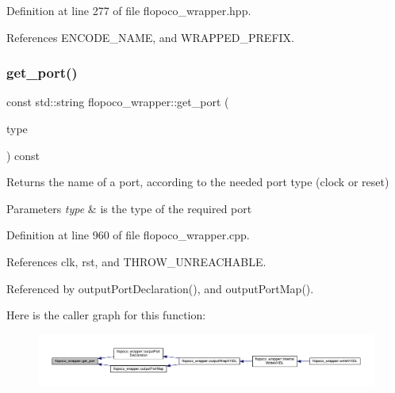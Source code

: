 Definition at line 277 of file flopoco\+\_\+wrapper.\+hpp.



References E\+N\+C\+O\+D\+E\+\_\+\+N\+A\+ME, and W\+R\+A\+P\+P\+E\+D\+\_\+\+P\+R\+E\+F\+IX.

\mbox{\label{classflopoco__wrapper_a582a468cce4977d1a2af23e5f719af2c}} 
\subsubsection{\texorpdfstring{get\+\_\+port()}{get\_port()}}
{\footnotesize\ttfamily const std\+::string flopoco\+\_\+wrapper\+::get\+\_\+port (\begin{DoxyParamCaption}\item[{\hyperlink{classflopoco__wrapper_af27fdf36f1f15e00384aeee46b6de5ac}{port\+\_\+type}}]{type }\end{DoxyParamCaption}) const\hspace{0.3cm}{\ttfamily [private]}}



Returns the name of a port, according to the needed port type (clock or reset) 


\begin{DoxyParams}{Parameters}
{\em type} & is the type of the required port \\
\hline
\end{DoxyParams}


Definition at line 960 of file flopoco\+\_\+wrapper.\+cpp.



References clk, rst, and T\+H\+R\+O\+W\+\_\+\+U\+N\+R\+E\+A\+C\+H\+A\+B\+LE.



Referenced by output\+Port\+Declaration(), and output\+Port\+Map().

Here is the caller graph for this function\+:
\nopagebreak
\begin{figure}[H]
\begin{center}
\leavevmode
\includegraphics[width=350pt]{d7/dbf/classflopoco__wrapper_a582a468cce4977d1a2af23e5f719af2c_icgraph}
\end{center}
\end{figure}
\mbox{\label{classflopoco__wrapper_ae65f581fe20c9fa4595857e5f296c619}} 
